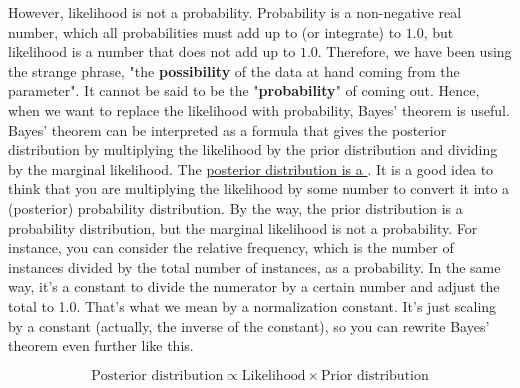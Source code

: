 \documentclass{ltjsbook}
\begin{document}
However, likelihood is not a probability. Probability is a non-negative real number, which all probabilities must add up to (or integrate) to $1.0$, but likelihood is a number that does not add up to $1.0$. Therefore, we have been using the strange phrase, "the \textbf{possibility} of the data at hand coming from the parameter". It cannot be said to be the "\textbf{probability}" of coming out. Hence, when we want to replace the likelihood with probability, Bayes' theorem is useful. Bayes' theorem can be interpreted as a formula that gives the posterior distribution by multiplying the likelihood by the prior distribution and dividing by the marginal likelihood. The \underline{posterior distribution is a }. It is a good idea to think that you are multiplying the likelihood by some number to convert it into a (posterior) probability distribution.
By the way, the prior distribution is a probability distribution, but the marginal likelihood is not a probability. For instance, you can consider the relative frequency, which is the number of instances divided by the total number of instances, as a probability. In the same way, it's a constant to divide the numerator by a certain number and adjust the total to 1.0. That's what we mean by a normalization constant. It's just scaling by a constant (actually, the inverse of the constant), so you can rewrite Bayes' theorem even further like this.

$$ \mbox{Posterior distribution} \propto \mbox{Likelihood} \times \mbox{Prior distribution} $$
\end{document}
